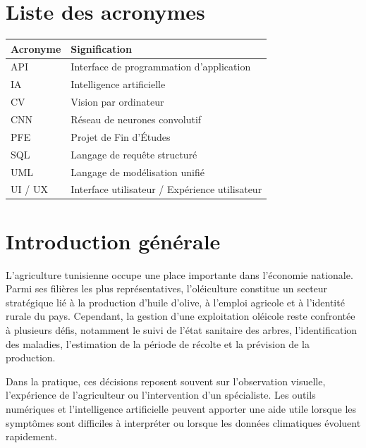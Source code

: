 \documentclass[12pt,a4paper]{report}
\begin{document}
\tableofcontents
\listoftables
\listoffigures

\chapter*{Liste des acronymes}
\begin{center}
\begin{tabular}{|p{3cm}|p{10cm}|}
\hline
\textbf{Acronyme} & \textbf{Signification} \\
\hline
API & Interface de programmation d'application \\
\hline
IA & Intelligence artificielle \\
\hline
CV & Vision par ordinateur \\
\hline
CNN & Réseau de neurones convolutif \\
\hline
PFE & Projet de Fin d'Études \\
\hline
SQL & Langage de requête structuré \\
\hline
UML & Langage de modélisation unifié \\
\hline
UI / UX & Interface utilisateur / Expérience utilisateur \\
\hline
\end{tabular}
\end{center}

\clearpage
{}
\chapter*{Introduction générale}
L'agriculture tunisienne occupe une place importante dans l'économie nationale. Parmi ses filières les plus représentatives, l'oléiculture constitue un secteur stratégique lié à la production d'huile d'olive, à l'emploi agricole et à l'identité rurale du pays. Cependant, la gestion d'une exploitation oléicole reste confrontée à plusieurs défis, notamment le suivi de l'état sanitaire des arbres, l'identification des maladies, l'estimation de la période de récolte et la prévision de la production.

Dans la pratique, ces décisions reposent souvent sur l'observation visuelle, l'expérience de l'agriculteur ou l'intervention d'un spécialiste. Les outils numériques et l'intelligence artificielle peuvent apporter une aide utile lorsque les symptômes sont difficiles à interpréter ou lorsque les données climatiques évoluent rapidement.
\end{document}
